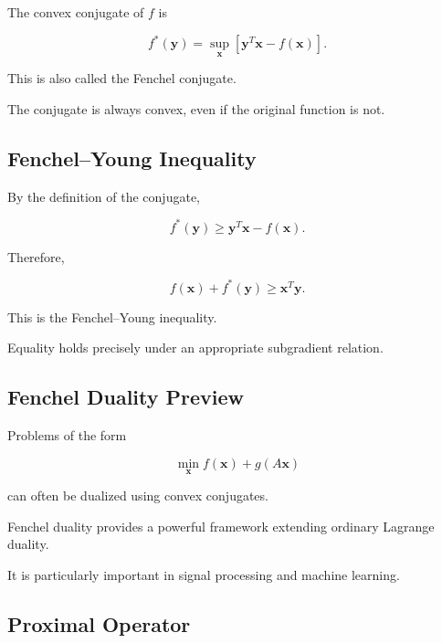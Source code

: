 The convex conjugate of \(f\) is

\[
\boxed{
f^*(\mathbf{y})
=
\sup_{\mathbf{x}}
\left[
\mathbf{y}^T\mathbf{x}
-
f(\mathbf{x})
\right].
}
\]

This is also called the Fenchel conjugate.

The conjugate is always convex, even if the original function is not.

\subsection{Fenchel--Young Inequality}
\label{subsec:fenchel-young}

By the definition of the conjugate,

\[
f^*(\mathbf{y})
\geq
\mathbf{y}^T\mathbf{x}
-
f(\mathbf{x}).
\]

Therefore,

\[
\boxed{
f(\mathbf{x})
+
f^*(\mathbf{y})
\geq
\mathbf{x}^T\mathbf{y}.
}
\]

This is the Fenchel--Young inequality.

Equality holds precisely under an appropriate subgradient relation.

\subsection{Fenchel Duality Preview}
\label{subsec:fenchel-duality-preview}

Problems of the form

\[
\boxed{
\min_{\mathbf{x}}
f(\mathbf{x})
+
g(A\mathbf{x})
}
\]

can often be dualized using convex conjugates.

Fenchel duality provides a powerful framework extending ordinary
Lagrange duality.

It is particularly important in signal processing and machine learning.

\subsection{Proximal Operator}
\label{subsec:proximal-operator}

